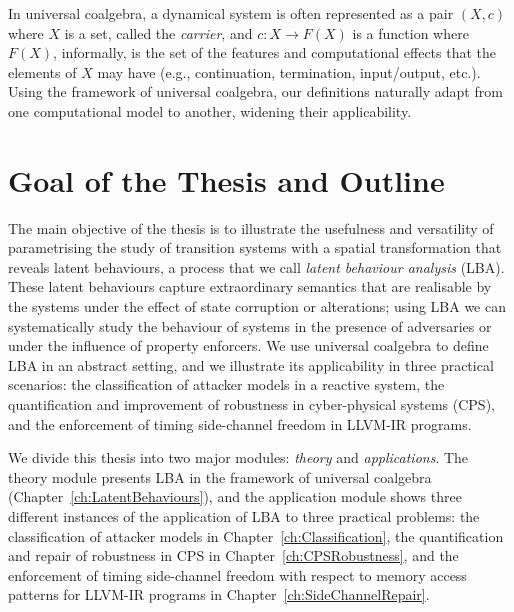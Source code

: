 In universal coalgebra, a dynamical system is often represented as a pair $(X,c)$ where $X$ is a set, called the \emph{carrier}, and $c\colon X\rightarrow F(X)$ is a function where $F(X)$, informally, is the set of the features and computational effects that the elements of $X$ may have (e.g., continuation, termination, input/output, etc.). Using the framework of universal coalgebra, our definitions naturally adapt from one computational model to another, widening their applicability. 




\section{Goal of the Thesis and Outline}
\label{sec:Introduction:Goal}
The main objective of the thesis is to illustrate the usefulness and versatility of parametrising the study of transition systems with a spatial transformation that reveals latent behaviours, a process that we call \emph{latent behaviour analysis} (LBA). These latent behaviours capture extraordinary semantics that are realisable by the systems under the effect of state corruption or alterations; using LBA we can systematically study the behaviour of systems in the presence of adversaries or under the influence of property enforcers. We use universal coalgebra to define LBA in an abstract setting, and we illustrate its applicability in three practical scenarios: the classification of attacker models in a reactive system, the quantification and improvement of robustness in cyber-physical systems (CPS), and the enforcement of timing side-channel freedom in LLVM-IR programs. 

We divide this thesis into two major modules: \emph{theory} and \emph{applications}. The theory module presents LBA in the framework of universal coalgebra (Chapter~\ref{ch:LatentBehaviours}), and the application module shows three different instances of the application of LBA to three practical problems: the classification of attacker models in Chapter~\ref{ch:Classification}, the quantification and repair of robustness in CPS in Chapter~\ref{ch:CPSRobustness}, and the enforcement of timing side-channel freedom with respect to memory access patterns for LLVM-IR programs in Chapter~\ref{ch:SideChannelRepair}.

